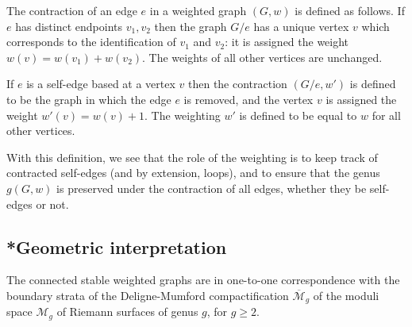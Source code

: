 \documentclass[12pt]{amsart}
\theoremstyle{plain}
\newcommand{\0}{\color{blue}{\mathsf{0}}}
\begin{document}
The contraction of an edge $e$ in a weighted graph $(G,w)$ is defined as follows. If $e$ has distinct endpoints $v_1,v_2$ then the graph $G/e$ has  a unique vertex $v$ which corresponds to the identification of $v_1$ and $v_2$: it is assigned the weight $w(v) = w(v_1)+ w(v_2)$. The weights of all other vertices are unchanged. 


If $e$ is a self-edge based at a vertex $v$ then the contraction $(G/e,w')$ is defined to be the graph in which the edge $e$ is removed, and the vertex $v$ is assigned the weight $w'(v) = w(v)+1$.  The weighting $w'$ is defined to be equal to $w$ for all other vertices.


\begin{figure}[h]
    
\end{figure}
With this definition, we see that the role of the weighting is to keep track of contracted self-edges (and by extension, loops), and to ensure that the genus $g(G,w)$ is preserved under the contraction of all  edges, whether they be self-edges or not.


\subsection{*Geometric interpretation} 
The connected stable weighted graphs are in one-to-one correspondence with the boundary strata of the Deligne-Mumford compactification $\overline{\mathcal{M}}_g$ of the moduli space $\mathcal{M}_g$ of Riemann surfaces of genus $g$, for $g\geq 2$. 
\end{document}
